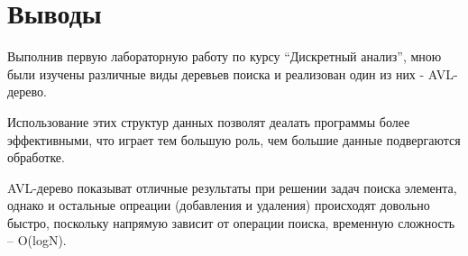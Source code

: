 \section{Выводы}

Выполнив первую лабораторную работу по курсу \enquote{Дискретный анализ}, мною были изучены различные виды деревьев поиска и реализован один из них - AVL-дерево.\newline

Использование этих структур данных позволят деалать программы более эффективными, что играет тем большую роль, чем большие данные подвергаются обработке.\newline

AVL-дерево показыват отличные результаты при решении задач поиска элемента, однако и остальные опреации (добавления и удаления) происходят довольно быстро, поскольку напрямую зависит от операции поиска, временную сложность – O(logN).\newline

\pagebreak